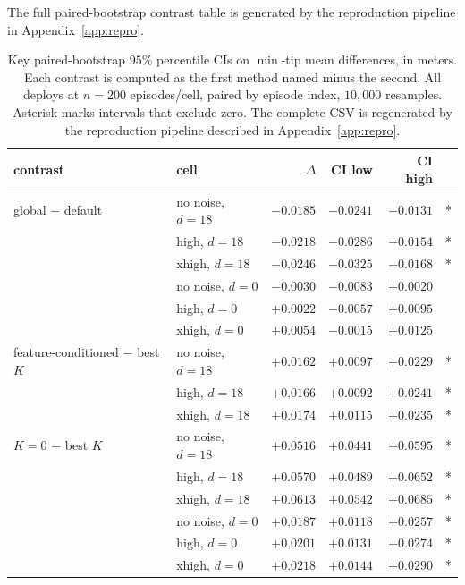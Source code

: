 \documentclass[sn-mathphys,NameDate,iicol]{sn-jnl}
\begin{document}
The full paired-bootstrap contrast table is generated by the
reproduction pipeline in Appendix~\ref{app:repro}.

\begin{table}[!htbp]
\centering
\caption{Key paired-bootstrap $95\%$ percentile CIs on $\min$-tip
mean differences, in meters. Each contrast is computed as the first
method named minus the second. All deploys at
$n{=}200$ episodes/cell, paired by episode index, $10{,}000$
resamples. Asterisk marks intervals that exclude zero.
The complete CSV is regenerated by the reproduction pipeline described
in Appendix~\ref{app:repro}.}
\setlength{\tabcolsep}{3pt}
\footnotesize
\begin{tabular}{@{}llrrrr@{}}
\toprule
contrast & cell & $\Delta$ & CI low & CI high & \\
\midrule
global $-$ default & no noise, $d{=}18$ & $-0.0185$ & $-0.0241$ & $-0.0131$ & * \\
 & high, $d{=}18$ & $-0.0218$ & $-0.0286$ & $-0.0154$ & * \\
 & xhigh, $d{=}18$ & $-0.0246$ & $-0.0325$ & $-0.0168$ & * \\
 & no noise, $d{=}0$ & $-0.0030$ & $-0.0083$ & $+0.0020$ & \\
 & high, $d{=}0$ & $+0.0022$ & $-0.0057$ & $+0.0095$ & \\
 & xhigh, $d{=}0$ & $+0.0054$ & $-0.0015$ & $+0.0125$ & \\
\addlinespace
feature-conditioned $-$ best $K$ & no noise, $d{=}18$ & $+0.0162$ & $+0.0097$ & $+0.0229$ & * \\
 & high, $d{=}18$ & $+0.0166$ & $+0.0092$ & $+0.0241$ & * \\
 & xhigh, $d{=}18$ & $+0.0174$ & $+0.0115$ & $+0.0235$ & * \\
\addlinespace
$K{=}0$ $-$ best $K$ & no noise, $d{=}18$ & $+0.0516$ & $+0.0441$ & $+0.0595$ & * \\
 & high, $d{=}18$ & $+0.0570$ & $+0.0489$ & $+0.0652$ & * \\
 & xhigh, $d{=}18$ & $+0.0613$ & $+0.0542$ & $+0.0685$ & * \\
 & no noise, $d{=}0$ & $+0.0187$ & $+0.0118$ & $+0.0257$ & * \\
 & high, $d{=}0$ & $+0.0201$ & $+0.0131$ & $+0.0274$ & * \\
 & xhigh, $d{=}0$ & $+0.0218$ & $+0.0144$ & $+0.0290$ & * \\
\bottomrule
\end{tabular}
\label{tab:r3_paired_ci}
\end{table}
\end{document}
